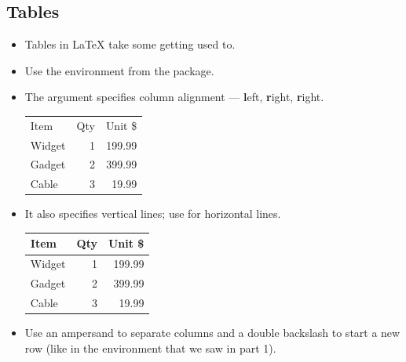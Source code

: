 \documentclass{beamer}
\begin{document}
\subsection{Tables}
\begin{frame}[fragile]{\insertsubsection}
\begin{itemize}
\item Tables in \LaTeX{} take some getting used to.
\item Use the  environment from the  package.
\item The argument specifies column alignment --- \textbf{l}eft, \textbf{r}ight, \textbf{r}ight.
\begin{exampletwouptiny}
\begin{tabular}{lrr}
Item   & Qty & Unit \$ \\
Widget & 1   & 199.99  \\
Gadget & 2   & 399.99  \\
Cable  & 3   & 19.99   \\
\end{tabular}
\end{exampletwouptiny}
\item It also specifies vertical lines; use  for horizontal lines.
\begin{exampletwouptiny}
\begin{tabular}{|l|r|r|} \hline
Item   & Qty & Unit \$ \\\hline
Widget & 1   & 199.99  \\
Gadget & 2   & 399.99  \\
Cable  & 3   & 19.99   \\\hline
\end{tabular}
\end{exampletwouptiny}
\item Use an ampersand \keystrokebftt{\&} to separate columns and a double backslash \keystrokebftt{\bs}\keystrokebftt{\bs} to start a new row (like in the  environment that we saw in part 1).
\end{itemize}
\end{frame}

\end{document}
